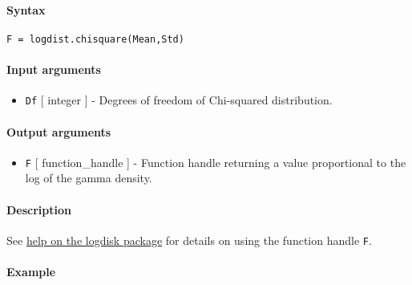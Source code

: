 


	\paragraph{Syntax}\label{syntax}

\begin{verbatim}
F = logdist.chisquare(Mean,Std)
\end{verbatim}

\paragraph{Input arguments}\label{input-arguments}

\begin{itemize}
\itemsep1pt\parskip0pt
\item
  \texttt{Df} {[} integer {]} - Degrees of freedom of Chi-squared
  distribution.
\end{itemize}

\paragraph{Output arguments}\label{output-arguments}

\begin{itemize}
\itemsep1pt\parskip0pt
\item
  \texttt{F} {[} function\_handle {]} - Function handle returning a
  value proportional to the log of the gamma density.
\end{itemize}

\paragraph{Description}\label{description}

See \href{logdist/Contents}{help on the logdisk package} for details on
using the function handle \texttt{F}.

\paragraph{Example}\label{example}


